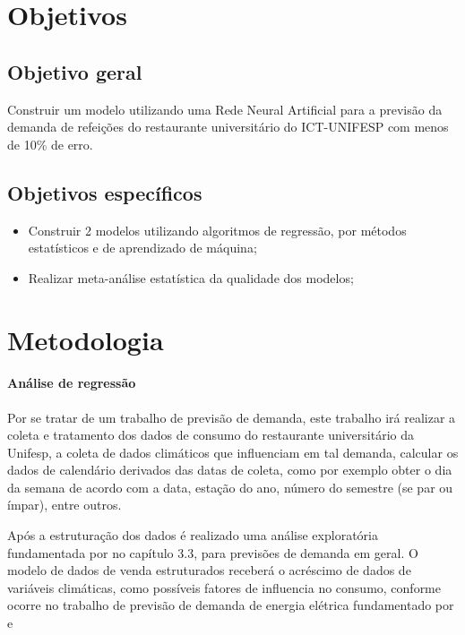 \documentclass[	12pt, Times, openright, twoside, a4paper, english, brazil]{abntex2}
\begin{document}
      \section{Objetivos}
        \subsection{Objetivo geral}
          Construir um modelo utilizando uma Rede Neural Artificial para a previsão da demanda de
          refeições do restaurante universitário do ICT-UNIFESP com menos de 10\% de erro.
        
        \subsection{Objetivos específicos}
          \begin{itemize}
          \item Construir 2 modelos utilizando algoritmos de regressão, por métodos estatísticos e de aprendizado de máquina; 
          \item Realizar meta-análise estatística da qualidade dos modelos;
          \end{itemize}

      \section{Metodologia}
        \paragraph*{Análise de regressão}

          Por se tratar de um trabalho de previsão de demanda,  este trabalho irá realizar a coleta e tratamento dos dados de consumo do restaurante universitário da Unifesp, a coleta de dados climáticos que influenciam em tal demanda, calcular os dados de calendário derivados das datas de coleta, como por exemplo obter o dia da semana de acordo com a data, estação do ano, número do semestre (se par ou ímpar), entre outros.

          Após a estruturação dos dados é realizado uma análise exploratória fundamentada por \cite{Junior2007} no capítulo 3.3, para previsões de demanda em geral.
          O modelo de dados de venda estruturados receberá o acréscimo de dados de variáveis climáticas, como possíveis fatores de influencia no consumo, conforme ocorre no trabalho de previsão de demanda de energia elétrica fundamentado por \cite{Almeida2013} \cite{Ruas2012} e \cite{Silva2010}
\end{document}
